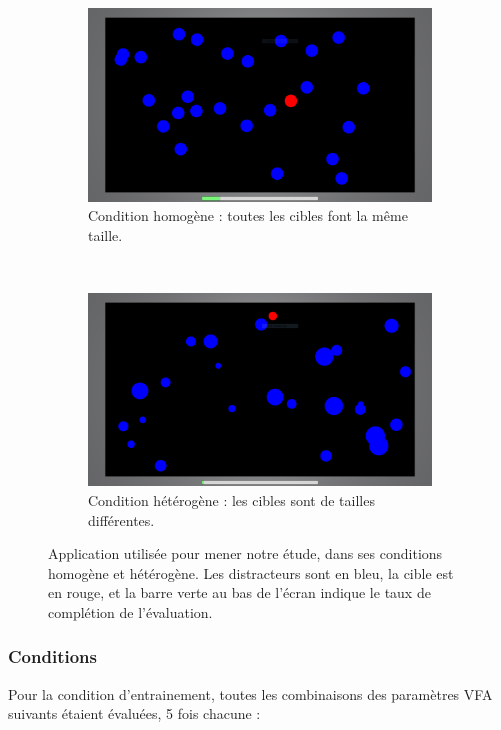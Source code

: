 	\begin{figure}[!htb]
		\begin{subfigure}[t]{0.49\textwidth}
			\centering
			\includegraphics[width=\textwidth]{figures/ch5/homoRunning}
			\caption{Condition homogène : toutes les cibles font la même taille.}
			\label{fig:homoRunning}
		\end{subfigure}
		~
		\begin{subfigure}[t]{0.49\textwidth}
			\centering
			\includegraphics[width=\textwidth]{figures/ch5/heteroRunning}
			\caption{Condition hétérogène : les cibles sont de tailles différentes.}
			\label{fig:heteroRunning}
		\end{subfigure}
		\caption[Application pour l'évaluation, homogène vs. hétérogène]{Application utilisée pour mener notre étude, dans ses conditions homogène et hétérogène. Les distracteurs sont en bleu, la cible est en rouge, et la barre verte au bas de l'écran indique le taux de complétion de l'évaluation.}
		\label{fig:evalAppRunning}
	\end{figure}
	
	\subsubsection{Conditions}
	Pour la condition d'entrainement, toutes les combinaisons des paramètres VFA suivants étaient évaluées, 5 fois chacune :
	
